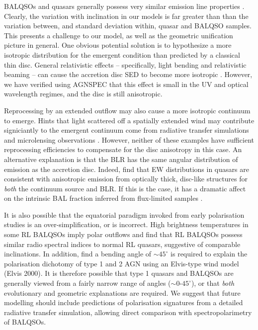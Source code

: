 \documentclass[useAMS,usenatbib]{mn2e_x}
\begin{document}
BALQSOs and quasars generally possess very similar emission line properties 
\citep[e.g.][]{weymann1991,reichard2003}. 
Clearly, the variation with inclination in our models is far greater than 
than the variation between, and standard deviation within, quasar and BALQSO samples.  
This presents a challenge to our model, as well as the geometric unification picture in general.
One obvious potential solution is to hypothesize a more isotropic distribution 
for the emergent condition than predicted by a classical thin disc. 
General relativistic effects -- specifically, light bending
and relativistic beaming -- can cause 
the accretion disc SED to become more isotropic \citep[e.g.][]{zhang1997,munozdarias2013}. 
However, we have verified using AGNSPEC \citep{hubeny2000,hubeny2001,hubenyhubeny1997}
that this effect is small in the UV and optical wavelength regimes, 
and the disc is still anisotropic.

Reprocessing by an extended outflow may also cause a more isotropic
continuum to emerge. Hints that light scattered off a spatially extended 
wind may contribute signiciantly to the emergent continuum come from radiative transfer
simulations \citep{simproga2012} and microlensing observations \citep{sluse2015}.
However, neither of these examples have sufficient reprocessing efficiencies to 
compensate for the disc anisotropy in this case.
An alternative explanation is that the BLR has the same angular distribution 
of emission as the accretion disc.
Indeed, \cite{risaliti2011} find that EW distributions in quasars are consistent with anisotropic emission 
from optically thick, disc-like structures for {\em both} the continuum source and BLR. 
If this is the case, it has a dramatic affect on the intrinsic
BAL fraction inferred from flux-limited samples \citep{goodrich1997,krolikvoit1998}. 

It is also possible that the equatorial paradigm invoked from early polarisation
studies \citep{goodrich1995, cohen1995,brotherton2006} 
is an over-simplification, or is incorrect. 
High brightness temperatures in some RL BALQSOs imply polar outflows \citep{zhou2006} 
and \cite{bruni2012} find that
RL BALQSOs possess similar radio spectral indices to normal RL quasars, 
suggestive of comparable inclinations. 
In addition, \cite{marin2013} find a bending angle of $\sim45^\circ$ is required to 
explain the polarisation dichotomy of type 1 and 2 AGN using an Elvis-type wind 
model (Elvis 2000). It is therefore possible 
that type 1 quasars and BALQSOs are generally viewed from a fairly narrow range of angles 
($\sim0$-$45^\circ$), or that {\em both} evolutionary and geometric explanations are required.
We suggest that future modelling should include predictions of polarisation signatures
from a detailed radiative transfer simulation, allowing direct comparison with spectropolarimetry
of BALQSOs. 
\end{document}
